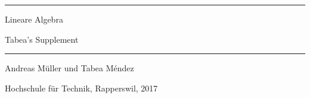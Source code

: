 \documentclass{book}
\begin{document}
\pagestyle{fancy}
\frontmatter
\newcommand\HRule{\noindent\rule{\linewidth}{1.5pt}}
\begin{titlepage}
\HRule
\vspace*{10pt}
\begin{flushright}
{\Huge
Lineare Algebra}

\vspace*{10pt}
{\LARGE
Tabea's Supplement}
\end{flushright}
\HRule
\begin{flushright}
\vspace{30pt}
\LARGE
Andreas Müller
und
Tabea Méndez
\end{flushright}
\begin{center}
Hochschule für Technik, Rapperswil, 2017
\end{center}
\end{titlepage}
\hypersetup{
    linktoc=all,
    linkcolor=blue
}
\tableofcontents
\newtheorem{satz}{Satz}[chapter]
\newtheorem{lemma}{Lemma}[chapter]
\newtheorem{proposition}{Proposition}[chapter]
\newtheorem{hilfssatz}[satz]{Hilfssatz}
\newtheorem{definition}[satz]{Definition}
\newtheorem{annahme}[satz]{Annahme}
\newtheorem{aufgabe}[satz]{Aufgabe}
\newenvironment{beispiel}[1][Beispiel]{%
\begin{proof}[\bf #1]%
\renewcommand{\qedsymbol}{$\bigcirc$}%
}{\end{proof}}
\mainmatter
\allowdisplaybreaks
















\vfill
\pagebreak
\ifodd\value{page}\else\null\clearpage\fi

\appendix
\end{document}
